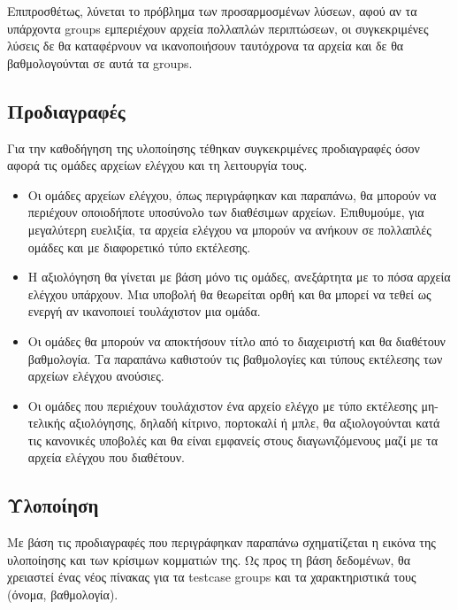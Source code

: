 \documentclass[diploma]{softlab-thesis}
\begin{document}
Επιπροσθέτως, λύνεται το πρόβλημα των προσαρμοσμένων λύσεων, αφού αν τα
υπάρχοντα groups εμπεριέχουν αρχεία πολλαπλών περιπτώσεων, οι συγκεκριμένες
λύσεις δε θα καταφέρνουν να ικανοποιήσουν ταυτόχρονα τα αρχεία και δε θα
βαθμολογούνται σε αυτά τα groups.

\subsection{Προδιαγραφές}

Για την καθοδήγηση της υλοποίησης τέθηκαν συγκεκριμένες προδιαγραφές όσον
αφορά τις ομάδες αρχείων ελέγχου και τη λειτουργία τους.

\begin{itemize}

    \item Οι ομάδες αρχείων ελέγχου, όπως περιγράφηκαν και παραπάνω, θα μπορούν
      να περιέχουν οποιοδήποτε υποσύνολο των διαθέσιμων αρχείων. Επιθυμούμε,
      για μεγαλύτερη ευελιξία, τα αρχεία ελέγχου να μπορούν να ανήκουν σε
      πολλαπλές ομάδες και με διαφορετικό τύπο εκτέλεσης.

    \item Η αξιολόγηση θα γίνεται με βάση μόνο τις ομάδες, ανεξάρτητα με το
      πόσα αρχεία ελέγχου υπάρχουν. Μια υποβολή θα θεωρείται ορθή και θα μπορεί
      να τεθεί ως ενεργή αν ικανοποιεί τουλάχιστον μια ομάδα.

    \item Οι ομάδες θα μπορούν να αποκτήσουν τίτλο από το διαχειριστή και θα
      διαθέτουν βαθμολογία. Τα παραπάνω καθιστούν τις βαθμολογίες και τύπους
      εκτέλεσης των αρχείων ελέγχου ανούσιες.

    \item Οι ομάδες που περιέχουν τουλάχιστον ένα αρχείο ελέγχο με τύπο εκτέλεσης
      μη-τελικής αξιολόγησης, δηλαδή κίτρινο, πορτοκαλί ή μπλε, θα αξιολογούνται
      κατά τις κανονικές υποβολές και θα είναι εμφανείς στους διαγωνιζόμενους
      μαζί με τα αρχεία ελέγχου που διαθέτουν.

\end{itemize}

\subsection{Υλοποίηση}

Με βάση τις προδιαγραφές που περιγράφηκαν παραπάνω σχηματίζεται η εικόνα της
υλοποίησης και των κρίσιμων κομματιών της. Ως προς τη βάση δεδομένων, θα
χρειαστεί ένας νέος πίνακας για τα testcase groups και τα χαρακτηριστικά τους
(όνομα, βαθμολογία).
\end{document}
